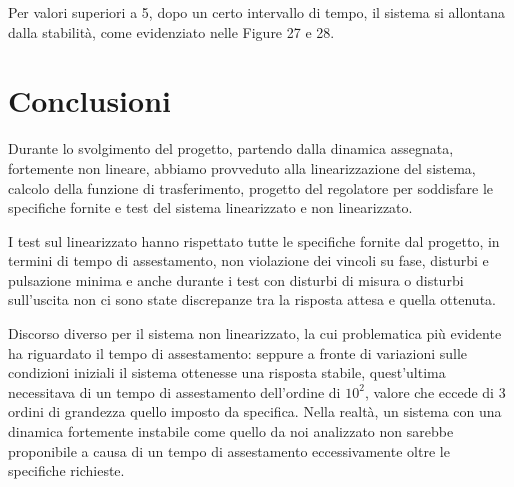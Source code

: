 \documentclass[a4paper, 11pt]{article}
\begin{document}
Per valori superiori a 5, dopo un certo intervallo di tempo, il sistema si allontana dalla stabilità, come evidenziato nelle Figure 27 e 28.

\clearpage

\section{Conclusioni}

Durante lo svolgimento del progetto, partendo dalla dinamica assegnata, fortemente non lineare, abbiamo provveduto alla linearizzazione del sistema, calcolo della funzione di trasferimento, progetto del regolatore per soddisfare le specifiche fornite e test del sistema linearizzato e non linearizzato. 

\vspace{0.3 cm}
I test sul linearizzato hanno rispettato tutte le specifiche fornite dal progetto, in termini di tempo di assestamento, non violazione dei vincoli su fase, disturbi e pulsazione minima e anche durante i test con disturbi di misura o disturbi sull'uscita non ci sono state discrepanze tra la risposta attesa e quella ottenuta.

\vspace{0.3 cm}
Discorso diverso per il sistema non linearizzato, la cui problematica più evidente ha riguardato il tempo di assestamento: seppure a fronte di variazioni sulle condizioni  iniziali il sistema ottenesse una risposta stabile, quest'ultima necessitava di un tempo di assestamento dell'ordine di $10^2$, valore che eccede di 3 ordini di grandezza quello imposto da specifica. Nella realtà, un sistema con una dinamica fortemente instabile come quello da noi analizzato non sarebbe proponibile a causa di un tempo di assestamento eccessivamente oltre le specifiche richieste. 
\end{document}

